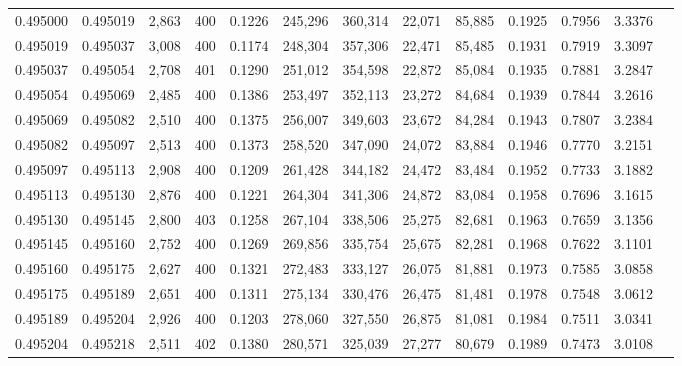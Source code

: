 \begin{tabular}{rrrrrrrrrrrrr}
0.495000 & 0.495019 & 2,863 & 400 &                                     0.1226 & 245,296 & 360,314 &  22,071 &  85,885 & 0.1925 & 0.7956 & 3.3376 \\
0.495019 & 0.495037 & 3,008 & 400 &                                     0.1174 & 248,304 & 357,306 &  22,471 &  85,485 & 0.1931 & 0.7919 & 3.3097 \\
0.495037 & 0.495054 & 2,708 & 401 &                                     0.1290 & 251,012 & 354,598 &  22,872 &  85,084 & 0.1935 & 0.7881 & 3.2847 \\
0.495054 & 0.495069 & 2,485 & 400 &                                     0.1386 & 253,497 & 352,113 &  23,272 &  84,684 & 0.1939 & 0.7844 & 3.2616 \\
0.495069 & 0.495082 & 2,510 & 400 &                                     0.1375 & 256,007 & 349,603 &  23,672 &  84,284 & 0.1943 & 0.7807 & 3.2384 \\
0.495082 & 0.495097 & 2,513 & 400 &                                     0.1373 & 258,520 & 347,090 &  24,072 &  83,884 & 0.1946 & 0.7770 & 3.2151 \\
0.495097 & 0.495113 & 2,908 & 400 &                                     0.1209 & 261,428 & 344,182 &  24,472 &  83,484 & 0.1952 & 0.7733 & 3.1882 \\
0.495113 & 0.495130 & 2,876 & 400 &                                     0.1221 & 264,304 & 341,306 &  24,872 &  83,084 & 0.1958 & 0.7696 & 3.1615 \\
0.495130 & 0.495145 & 2,800 & 403 &                                     0.1258 & 267,104 & 338,506 &  25,275 &  82,681 & 0.1963 & 0.7659 & 3.1356 \\
0.495145 & 0.495160 & 2,752 & 400 &                                     0.1269 & 269,856 & 335,754 &  25,675 &  82,281 & 0.1968 & 0.7622 & 3.1101 \\
0.495160 & 0.495175 & 2,627 & 400 &                                     0.1321 & 272,483 & 333,127 &  26,075 &  81,881 & 0.1973 & 0.7585 & 3.0858 \\
0.495175 & 0.495189 & 2,651 & 400 &                                     0.1311 & 275,134 & 330,476 &  26,475 &  81,481 & 0.1978 & 0.7548 & 3.0612 \\
0.495189 & 0.495204 & 2,926 & 400 &                                     0.1203 & 278,060 & 327,550 &  26,875 &  81,081 & 0.1984 & 0.7511 & 3.0341 \\
0.495204 & 0.495218 & 2,511 & 402 &                                     0.1380 & 280,571 & 325,039 &  27,277 &  80,679 & 0.1989 & 0.7473 & 3.0108 \\

\end{tabular}
